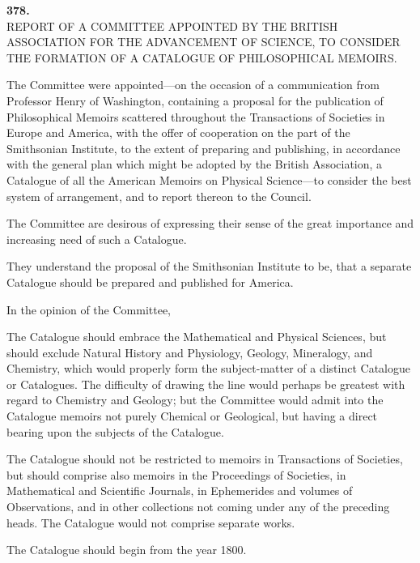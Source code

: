 \documentclass[11pt]{article}
\begin{document}
\bigskip

\begin{center}\textbf{378.}\\[2pt]
REPORT OF A COMMITTEE APPOINTED BY THE BRITISH ASSOCIATION FOR THE ADVANCEMENT OF SCIENCE, TO CONSIDER THE FORMATION OF A CATALOGUE OF PHILOSOPHICAL MEMOIRS.\end{center}


\medskip

The Committee were appointed---on the occasion of a communication from Professor Henry of Washington, containing a proposal for the publication of Philosophical Memoirs scattered throughout the Transactions of Societies in Europe and America, with the offer of cooperation on the part of the Smithsonian Institute, to the extent of preparing and publishing, in accordance with the general plan which might be adopted by the British Association, a Catalogue of all the American Memoirs on Physical Science---to consider the best system of arrangement, and to report thereon to the Council.

The Committee are desirous of expressing their sense of the great importance and increasing need of such a Catalogue.

They understand the proposal of the Smithsonian Institute to be, that a separate Catalogue should be prepared and published for America.

In the opinion of the Committee,

The Catalogue should embrace the Mathematical and Physical Sciences, but should exclude Natural History and Physiology, Geology, Mineralogy, and Chemistry, which would properly form the subject-matter of a distinct Catalogue or Catalogues. The difficulty of drawing the line would perhaps be greatest with regard to Chemistry and Geology; but the Committee would admit into the Catalogue memoirs not purely Chemical or Geological, but having a direct bearing upon the subjects of the Catalogue.

The Catalogue should not be restricted to memoirs in Transactions of Societies, but should comprise also memoirs in the Proceedings of Societies, in Mathematical and Scientific Journals, in Ephemerides and volumes of Observations, and in other collections not coming under any of the preceding heads. The Catalogue would not comprise separate works.

The Catalogue should begin from the year 1800.
\end{document}
